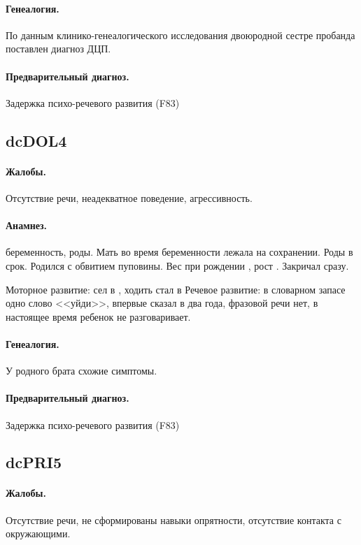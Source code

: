\documentclass[a4paper,14pt]{extarticle}
\newcommand{\gramm}{г}
\newcommand{\cm}{см}
\newcommand{\months}{мес.}
\begin{document}
\paragraph{Генеалогия.}
По данным клинико-генеалогического исследования двоюродной сестре пробанда поставлен диагноз ДЦП.

\paragraph{Предварительный диагноз.}
Задержка психо-речевого развития (F83)

\subsection*{dcDOL4}

\paragraph{Жалобы.}
Отсутствие речи, неадекватное поведение, агрессивность.

\paragraph{Анамнез.}
 беременность,  роды.
Мать во время беременности лежала на сохранении.
Роды в срок.
Родился с обвитием пуповины.
Вес при рождении \numprint[\gramm]{4470}, рост \numprint[\cm]{57}.
Закричал сразу.

Моторное развитие: сел в \numprint[\months]{7}, ходить стал в \numprint[\months]{10}
Речевое развитие: в словарном запасе одно слово <<уйди>>, впервые сказал в два года, фразовой речи нет, в настоящее время ребенок не разговаривает.

\paragraph{Генеалогия.}
У родного брата схожие симптомы.

\paragraph{Предварительный диагноз.}
Задержка психо-речевого развития (F83)

\subsection*{dcPRI5}

\paragraph{Жалобы.}
Отсутствие речи, не сформированы навыки опрятности, отсутствие контакта с окружающими.
\end{document}
